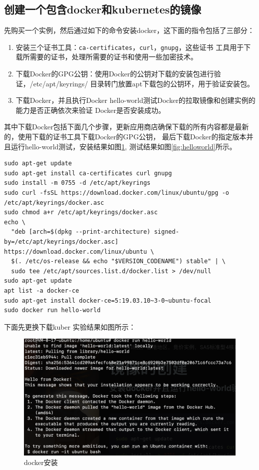 \documentclass{article}
\begin{document}
\subsection{创建一个包含docker和kubernetes的镜像}
先购买一个实例，然后通过如下的命令安装docker，这下面的指令包括了三部分：
\begin{enumerate}
    \item 安装三个证书工具：\texttt{ca-certificates}，\texttt{curl}，\texttt{gnupg}，这些证书
    工具用于下载所需要的证书，处理所需要的证书和使用一些加密技术。
    \item 下载Docker的GPG公钥：使用Docker的公钥对下载的安装包进行验证，/etc/apt/keyrings/
    目录转门放置apt下载包的公钥环，用于验证安装包。
    \item 下载Docker，并且执行Docker hello-world测试Docker的拉取镜像和创建实例的能力是否正确依次来验证
    Docker是否安装成功。
\end{enumerate}
其中下载Docker包括下面几个步骤，更新应用商店确保下载的所有内容都是最新的，使用下载的证书工具下载Docker的GPG公钥，
最后下载Docker的指定版本并且运行hello-world测试，安装结果如图\ref{fig:dockerinstall},
测试结果如图\ref{fig:helloworld}所示。
\begin{lstlisting}[style=bashstyle]
sudo apt-get update
sudo apt-get install ca-certificates curl gnupg
sudo install -m 0755 -d /etc/apt/keyrings
sudo curl -fsSL https://download.docker.com/linux/ubuntu/gpg -o /etc/apt/keyrings/docker.asc
sudo chmod a+r /etc/apt/keyrings/docker.asc
echo \
  "deb [arch=$(dpkg --print-architecture) signed-by=/etc/apt/keyrings/docker.asc] https://download.docker.com/linux/ubuntu \
  $(. /etc/os-release && echo "$VERSION_CODENAME") stable" | \
  sudo tee /etc/apt/sources.list.d/docker.list > /dev/null
sudo apt-get update
apt list -a docker-ce
sudo apt-get install docker-ce=5:19.03.10~3-0~ubuntu-focal
sudo docker run hello-world
\end{lstlisting}
下面先更换下载kuber
实验结果如图所示： \\
\noindent
\begin{minipage}{0.45\textwidth}
    \begin{figure}[H]
        \includegraphics[width=\textwidth]{dockerhelloworld.png}
        \caption{docker安装}
        \label{fig:dockerinstall}
    \end{figure}
\end{minipage}
\end{document}
